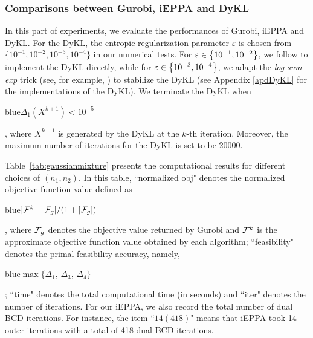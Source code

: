 \documentclass[10pt]{article}
\newcommand{\blue}[1]{\begin{color}{blue}#1\end{color}}
\newcommand{\red}[1]{\begin{color}{red}#1\end{color}}
\newcommand{\cF}{{\cal F}}
\begin{document}
\subsubsection{Comparisons between Gurobi, iEPPA and DyKL}

In this part of experiments, we evaluate the performances of Gurobi, iEPPA and DyKL. For the DyKL, the entropic regularization parameter $\varepsilon$ is chosen from $\big\{10^{-1},10^{-2},10^{-3},10^{-4}\big\}$ in our numerical tests. For $\varepsilon\in\big{\{} 10^{-1},10^{-2}\big{\}}$, we follow
\cite[Section 5.2]{bccnp2015iterative} to implement the DyKL directly, while for $\varepsilon\in\big{\{} 10^{-3},10^{-4}\big{\}}$, we adapt the \textit{log-sum-exp} trick (see, for example,
\cite[Section 4.4]{pc2019computational}) to stabilize the DyKL (see Appendix \ref{apdDyKL} for the implementations of the DyKL). We terminate the DyKL when \blue{$\Delta_1(X^{k+1})<10^{-5}$}, where $X^{k+1}$ is generated by the DyKL at the $k$-th iteration.
Moreover, the maximum number of iterations for the DyKL is set to be 20000.

Table~\ref{tab:gaussianmixture} presents the computational results for different choices of $(n_1, n_2)$. In this table, ``normalized obj" denotes the normalized objective function value defined as \blue{$|\cF^k - \cF_{g}|/(1+|\cF_{g}|)$}, where $\cF_{g}$ denotes the objective value returned by Gurobi and $\cF^k$ is the approximate objective function value obtained by each algorithm; ``feasibility" denotes the primal feasibility accuracy, namely, \blue{$\max\{\Delta_1, \,\Delta_3, \,\Delta_4\}$}; ``time" denotes the total computational time (in seconds) and ``iter" denotes the number of iterations.
For our iEPPA, we also record the total number of dual BCD iterations. For instance, the item ``$14(418)$" means that iEPPA took 14 outer iterations with a total of 418 dual BCD iterations.
\end{document}
